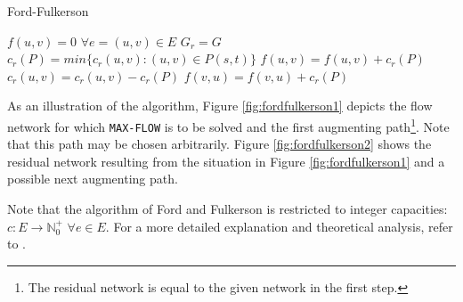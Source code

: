 \documentclass[a4paper,10pt, twocolumn]{article}
\begin{document}
\begin{algorithm}
\caption{Ford-Fulkerson}
\label{algo:fordFulkerson}
\begin{algorithmic}[1]
	\State $f(u,v) = 0$ $\forall e=(u,v) \in E$ 
	\State  $G_r = G$ 
	\State $c_r(P) = min \{c_r(u,v): (u,v) \in P(s,t) \}$
		\State $f(u,v) = f(u,v) + c_r(P)$ 
		\State $c_r(u,v) = c_r(u,v) - c_r(P)$
		\State $f(v,u) = f(v,u) + c_r(P)$ 
	\EndWhile
	\EndFunction
\end{algorithmic}
\end{algorithm}

As an illustration of the algorithm, Figure \ref{fig:fordfulkerson1} depicts the flow network for which \lstinline|MAX-FLOW| is to be solved and the first augmenting path\footnote{The residual network is equal to the given network in the first step.}. Note that this path may be chosen arbitrarily. Figure \ref{fig:fordfulkerson2} shows the residual network resulting from the situation in Figure \ref{fig:fordfulkerson1} and a possible next augmenting path. 

Note that the algorithm of Ford and Fulkerson is restricted to integer capacities:  $c:E\rightarrow \mathbb{N}_0^{+}$ $\forall e \in E$. For a more detailed explanation and theoretical analysis, refer to \cite{ahuja93}.
\end{document}
